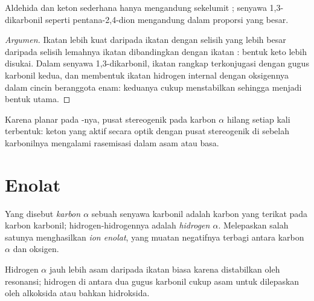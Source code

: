 \begin{proposition}\label{prop:b2:enolates-aldol:enol-content}
Aldehida dan keton sederhana hanya mengandung sekelumit ; senyawa
1,3-dikarbonil seperti pentana-2,4-dion mengandung  dalam proporsi yang
besar.
\end{proposition}

\begin{proof}[Argumen]
Ikatan  lebih kuat daripada ikatan  dengan selisih yang
lebih besar daripada selisih lemahnya ikatan  dibandingkan dengan
ikatan : bentuk keto lebih disukai. Dalam senyawa 1,3-dikarbonil,
ikatan rangkap  terkonjugasi dengan gugus karbonil kedua, dan 
 membentuk ikatan hidrogen internal dengan oksigennya dalam cincin
beranggota enam: keduanya cukup menstabilkan  sehingga  menjadi
bentuk utama.
\end{proof}

Karena  planar pada -nya, pusat stereogenik pada karbon $\alpha$
hilang setiap kali  terbentuk: keton yang aktif secara optik dengan
pusat stereogenik di sebelah karbonilnya mengalami rasemisasi dalam asam
atau basa.

\section{Enolat}

\begin{definition}[Enolat]\label{def:b2:enolates-aldol:enolate}
Yang disebut \emph{karbon $\alpha$} sebuah
senyawa karbonil adalah karbon yang terikat pada karbon karbonil;
hidrogen-hidrogennya adalah \emph{hidrogen $\alpha$}.
Melepaskan salah satunya menghasilkan \emph{ion enolat},
yang muatan negatifnya terbagi antara karbon $\alpha$ dan oksigen.
\end{definition}

\begin{proposition}\label{prop:b2:enolates-aldol:alpha-acidity}
Hidrogen $\alpha$ jauh lebih asam daripada ikatan  biasa karena
 distabilkan oleh resonansi; hidrogen di antara dua gugus karbonil
cukup asam untuk dilepaskan oleh alkoksida atau bahkan hidroksida.
\end{proposition}

